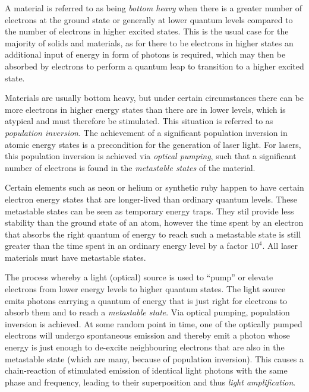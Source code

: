 \begin{itemize}

	A material is referred to as being \emph{bottom heavy} when there is a greater number of electrons at the ground state or generally at lower quantum levels compared to the number of electrons in higher excited states. This is the usual case for the majority of solids and materials, as for there to be electrons in higher states an additional input of energy in form of photons is required, which may then be absorbed by electrons to perform a quantum leap to transition to a higher excited state.


	Materials are usually bottom heavy, but under certain circumstances there can be more electrons in higher energy states than there are in lower levels, which is atypical and must therefore be stimulated. This situation is referred to as \emph{population inversion}. The achievement of a significant population inversion in atomic energy states is a precondition for the generation of laser light. For lasers, this population inversion is achieved via \emph{optical pumping}, such that a significant number of electrons is found in the \emph{metastable states} of the material.


	Certain elements such as neon or helium or synthetic ruby happen to have certain electron energy states that are longer-lived than ordinary quantum levels. These metastable states can be seen as temporary energy traps. They stil provide less stability than the ground state of an atom, however the time spent by an electron that absorbs the right quantum of energy to reach such a metastable state is still greater than the time spent in an ordinary energy level by a factor $10^4$. All laser materials must have metastable states.


	The process whereby a light (optical) source is used to ``pump'' or elevate electrons from lower energy levels to higher quantum states. The light source emits photons carrying a quantum of energy that is just right for electrons to absorb them and to reach a \emph{metastable state}. Via optical pumping, population inversion is achieved. At some random point in time, one of the optically pumped electrons will undergo spontaneous emission and thereby emit a photon whose energy is just enough to de-excite neighbouring electrons that are also in the metastable state (which are many, because of population inversion). This causes a chain-reaction of stimulated emission of identical light photons with the same phase and frequency, leading to their superposition and thus \emph{light amplification}.


\end{itemize}
